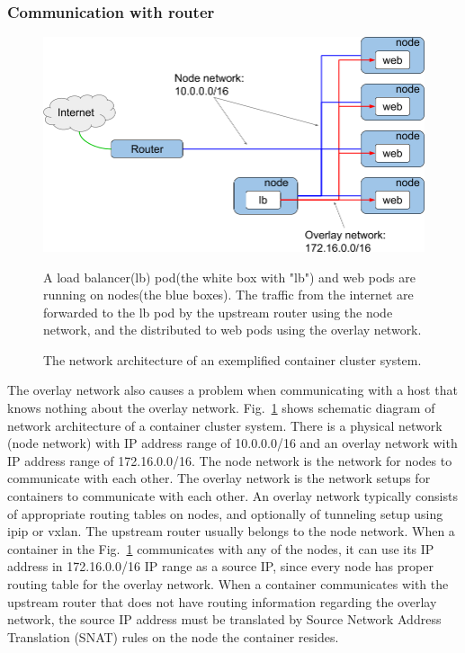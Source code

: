 \subsubsection{Communication with router}

\begin{figure}[h]
\centering
\includegraphics[width=0.8\columnwidth]{Figs/overlay.png}
\caption{The network architecture of an exemplified container cluster system. }

  A load balancer(lb) pod(the white box with "lb") and web pods are running on nodes(the blue boxes).
  The traffic from the internet are forwarded to the lb pod by the upstream router using the node network,
  and the distributed to web pods using the overlay network.

\label{fig:overlay}
\end{figure}

The overlay network also causes a problem when communicating with a host that knows nothing about the overlay network.
Fig.~\ref{fig:overlay} shows schematic diagram of network architecture of a container cluster system. 
There is a physical network (node network) with IP address range of 10.0.0.0/16 and an overlay network with IP address range of 172.16.0.0/16.
The node network is the network for nodes to communicate with each other.
The overlay network is the network setups for containers to communicate with each other.
An overlay network typically consists of appropriate routing tables on nodes, and optionally of tunneling setup using ipip or vxlan.
The upstream router usually belongs to the node network.
When a container in the Fig.~\ref{fig:overlay} communicates with any of the nodes, it can use its IP address in 172.16.0.0/16 IP range as a source IP, since every node has proper routing table for the overlay network.
When a container communicates with the upstream router that does not have routing information regarding the overlay network, the source IP address must be translated by Source Network Address Translation (SNAT) rules on the node the container resides.

